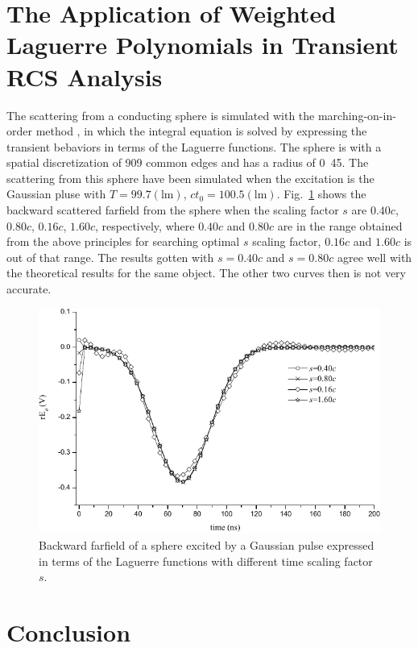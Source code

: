\documentclass[conference, a4paper]{IEEEtran}
\begin{document}
\section{The Application of Weighted Laguerre Polynomials in Transient
RCS Analysis}
The scattering from a conducting sphere is simulated with the 
marching-on-in-order method \cite{jizhong:solving:2006}, in which the integral equation is
solved by expressing the transient bebaviors in terms of the Laguerre
functions. The sphere is with a spatial discretization of 909 common
edges and has a radius of \unit{0.45}{\meter}. The scattering from this
sphere have been simulated when the excitation is the Gaussian pluse
with $T=99.7(\mathrm{lm})$, $ct_0=100.5(\mathrm{lm})$.
Fig.~\ref{scatter} shows the backward scattered farfield from the sphere
when the scaling factor $s$ are $0.40c$, $0.80c$, $0.16c$, $1.60c$,
respectively, where $0.40c$ and $0.80c$ are in the range obtained from
the above principles for searching optimal $s$ scaling factor, $0.16c$ and
$1.60c$ is out of that range. The results gotten with $s=0.40c$ and $s=0.80c$ agree well
with the theoretical results for the same object. The other two curves
then is not very accurate. 
\begin{figure}
    \centering
    \includegraphics[scale=.75]{scatter.pdf}
    \caption{Backward farfield of a sphere excited by a Gaussian pulse
    expressed in terms of the Laguerre functions with different time
    scaling factor $s$.}
    \label{scatter}
\end{figure}

\section{Conclusion}
\end{document}
